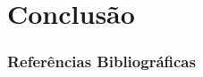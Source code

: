 \documentclass{beamer}
\begin{document}
\section{Conclusão}
\begin{frame}%
    \frametitle{Referências Bibliográficas}
    \tiny{}
    
\end{frame}
\end{document}
